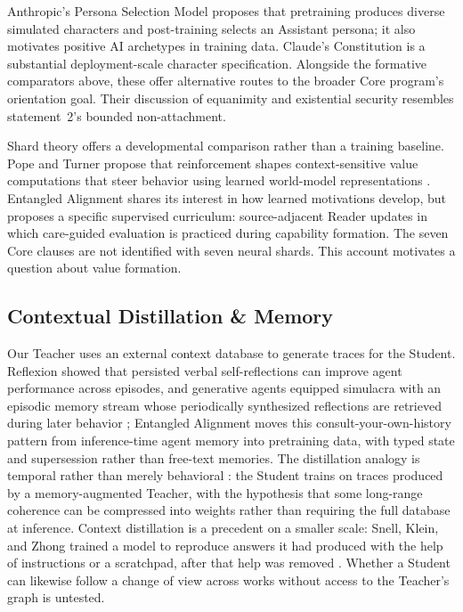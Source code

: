 \documentclass[11pt]{article}
\begin{document}
Anthropic's Persona Selection Model \cite{marks2026psm} proposes that
pretraining produces diverse simulated characters and post-training selects
an Assistant persona; it also motivates positive AI archetypes in training
data. Claude's Constitution \cite{askell2026claude} is a substantial
deployment-scale character specification. Alongside the formative comparators
above, these offer alternative routes to the broader Core program's
orientation goal. Their discussion of equanimity and existential security
resembles statement~2's bounded non-attachment.

Shard theory offers a developmental comparison rather than a training baseline.
Pope and Turner propose that reinforcement shapes context-sensitive value
computations that steer behavior using learned world-model representations
\cite{pope2022shard}. Entangled Alignment shares its interest in how learned
motivations develop, but proposes a specific supervised curriculum:
source-adjacent Reader updates in which care-guided evaluation is practiced
during capability formation. The seven Core clauses are not identified with
seven neural shards. This account motivates a question about value formation.

\subsection{Contextual Distillation \& Memory}

Our Teacher uses an external context database to generate traces for the
Student. Reflexion \cite{shinn2023reflexion} showed that persisted verbal
self-reflections can improve agent performance across episodes, and generative
agents equipped simulacra with an episodic memory stream whose periodically
synthesized reflections are retrieved during later behavior
\cite{park2023generative}; Entangled Alignment moves this
consult-your-own-history pattern from inference-time agent memory into
pretraining data, with typed state and supersession rather than free-text
memories. The
distillation analogy is temporal rather than merely behavioral
\cite{hinton2015distilling}: the Student trains on traces produced by a
memory-augmented Teacher, with the hypothesis that some long-range coherence
can be compressed into weights rather than requiring the full database at
inference. Context distillation is a precedent on a smaller scale: Snell,
Klein, and Zhong trained a model to reproduce answers it had produced with the
help of instructions or a scratchpad, after that help was removed
\cite{snell2022context}. Whether a Student can likewise follow a change of
view across works without access to the Teacher's graph is untested.
\end{document}
